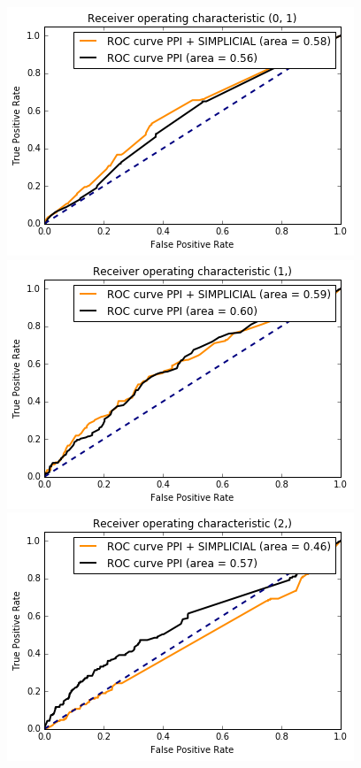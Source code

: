 \documentclass[9pt]{article}
\begin{document}
{\newpage
\begin{figure}[!htb]
  \includegraphics[width=\linewidth]{logisticRegressionGraphs/forS1.png}
\endminipage\hfill
{}
  \includegraphics[width=\linewidth]{logisticRegressionGraphs/forS2.png}
\endminipage\hfill
{}%
  \includegraphics[width=\linewidth]{logisticRegressionGraphs/forS3.png}

\end{figure}}
\end{document}
